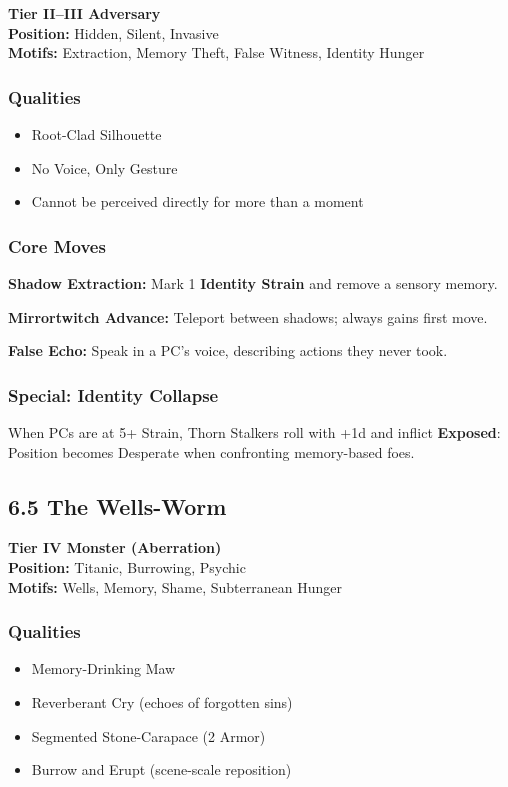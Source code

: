 \documentclass[11pt]{book}
\begin{document}
\textbf{Tier II--III Adversary} \\
\textbf{Position:} Hidden, Silent, Invasive \\
\textbf{Motifs:} Extraction, Memory Theft, False Witness, Identity Hunger

\subsubsection*{Qualities}
\begin{itemize}[leftmargin=*]
    \item Root-Clad Silhouette
    \item No Voice, Only Gesture
    \item Cannot be perceived directly for more than a moment
\end{itemize}

\subsubsection*{Core Moves}
\textbf{Shadow Extraction:} Mark 1 \textbf{Identity Strain} and remove a sensory memory.

\textbf{Mirrortwitch Advance:} Teleport between shadows; always gains first move.

\textbf{False Echo:} Speak in a PC's voice, describing actions they never took.

\subsubsection*{Special: Identity Collapse}
When PCs are at 5+ Strain, Thorn Stalkers roll with +1d and inflict  
\textbf{Exposed}: Position becomes Desperate when confronting memory-based foes.

\subsection{6.5 The Wells-Worm}

\textbf{Tier IV Monster (Aberration)} \\
\textbf{Position:} Titanic, Burrowing, Psychic \\
\textbf{Motifs:} Wells, Memory, Shame, Subterranean Hunger

\subsubsection*{Qualities}
\begin{itemize}[leftmargin=*]
    \item Memory-Drinking Maw
    \item Reverberant Cry (echoes of forgotten sins)
    \item Segmented Stone-Carapace (2 Armor)
    \item Burrow and Erupt (scene-scale reposition)
\end{itemize}
\end{document}
